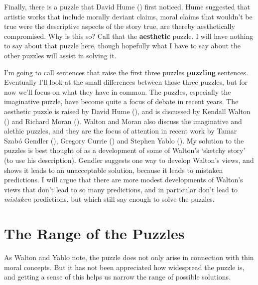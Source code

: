\documentclass[
  10pt,
  letterpaper,
  DIV=11,
  numbers=noendperiod,
  twoside]{scrartcl}
\begin{document}
Finally, there is a puzzle that David Hume
() first noticed. Hume suggested that
artistic works that include morally deviant claims, moral claims that
wouldn't be true were the descriptive aspects of the story true, are
thereby aesthetically compromised. Why is this so? Call that the
\textbf{aesthetic} puzzle. I will have nothing to say about that puzzle
here, though hopefully what I have to say about the other puzzles will
assist in solving it.

I'm going to call sentences that raise the first three puzzles
\textbf{puzzling} sentences. Eventually I'll look at the small
differences between those three puzzles, but for now we'll focus on what
they have in common. The puzzles, especially the imaginative puzzle,
have become quite a focus of debate in recent years. The aesthetic
puzzle is raised by David Hume (), and is
discussed by Kendall Walton () and
Richard Moran (). Walton and Moran also
discuss the imaginative and alethic puzzles, and they are the focus of
attention in recent work by Tamar Szabó Gendler
(), Gregory Currie
() and Stephen Yablo
(). My solution to the puzzles is best
thought of as a development of some of Walton's `sketchy story' (to use
his description). Gendler suggests one way to develop Walton's views,
and shows it leads to an unacceptable solution, because it leads to
mistaken predictions. I will argue that there are more modest
developments of Walton's views that don't lead to so many predictions,
and in particular don't lead to \emph{mistaken} predictions, but which
still say enough to solve the puzzles.

\section{The Range of the Puzzles}\label{the-range-of-the-puzzles}

As Walton and Yablo note, the puzzle does not only arise in connection
with thin moral concepts. But it has not been appreciated how widespread
the puzzle is, and getting a sense of this helps us narrow the range of
possible solutions.
\end{document}
